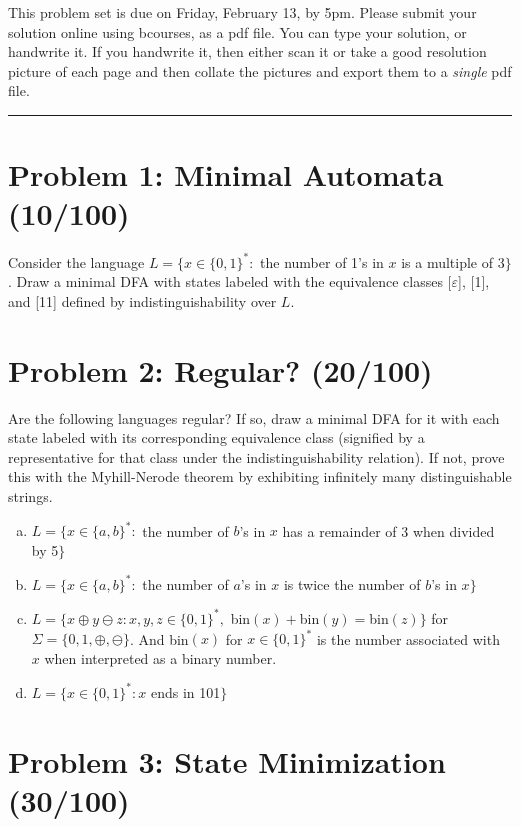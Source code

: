 \documentclass[11pt]{article}
\begin{document}
This problem set is due on Friday, February 13, by 5pm. Please submit your solution online using bcourses,
as a pdf file.
You can type your solution, or handwrite it. If you handwrite it, then either
scan it or take a good resolution picture of each page and then collate the pictures
and export them to a {\em single} pdf file.
\bigskip
\hrule



\section*{Problem 1: Minimal Automata (10/100)}
Consider the language $L=\{x\in\{0,1\}^*:$ the number of 1's in $x$ is a multiple of 3$\}$.  Draw a minimal DFA with states labeled with the equivalence classes [$\varepsilon$], [1], and [11] defined by indistinguishability over $L$.

\section*{Problem 2: Regular? (20/100)}

Are the following languages regular?  If so, draw a minimal DFA for it with each state labeled with its corresponding equivalence class (signified by a representative for that class under the indistinguishability relation).  If not, prove this with the Myhill-Nerode theorem by exhibiting infinitely many distinguishable strings.

\begin{enumerate}[a)]
\item $L=\{x\in\{a,b\}^*:$ the number of $b$'s in $x$ has a remainder of 3 when divided by 5$\}$

\item $L=\{x\in\{a,b\}^*:$ the number of $a$'s in $x$ is twice the number of $b$'s in $x\}$

\item $L=\{x\oplus y\ominus z:x,y,z\in\{0,1\}^*,$ bin$(x)+$bin$(y)=$bin$(z)\}$ for $\Sigma=\{0,1,\oplus,\ominus\}$.  And bin$(x)$ for $x\in\{0,1\}^*$ is the number associated with $x$ when interpreted as a binary number.

\item $L=\{x\in\{0,1\}^*: x$ ends in 101$\}$
\end{enumerate}



\section*{Problem 3: State Minimization (30/100)}
\end{document}

